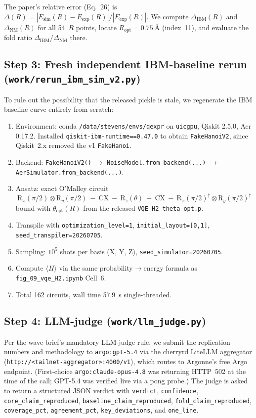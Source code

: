 \documentclass[11pt]{article}
\begin{document}
The paper's relative error (Eq.~26) is $\Delta(R) = |E_{\mathrm{sim}}(R) - E_{\mathrm{exp}}(R)| / |E_{\mathrm{exp}}(R)|$. We compute $\Delta_{\mathrm{IBM}}(R)$ and $\Delta_{\mathrm{NM}}(R)$ for all 54~$R$ points, locate $R_{\mathrm{opt}}=\SI{0.75}{\angstrom}$ (index~11), and evaluate the fold ratio $\Delta_{\mathrm{IBM}}/\Delta_{\mathrm{NM}}$ there.

\subsection{Step 3: Fresh independent IBM-baseline rerun (\texttt{work/rerun\_ibm\_sim\_v2.py})}
To rule out the possibility that the released pickle is stale, we regenerate the IBM baseline curve entirely from scratch:
\begin{enumerate}
  \item Environment: conda \texttt{/data/stevens/envs/qexpr} on \texttt{uicgpu}, Qiskit 2.5.0, Aer 0.17.2. Installed \texttt{qiskit-ibm-runtime==0.47.0} to obtain \texttt{FakeHanoiV2}, since Qiskit~2.x removed the v1 \texttt{FakeHanoi}.
  \item Backend: \texttt{FakeHanoiV2()} $\to$ \texttt{NoiseModel.from\_backend(...)} $\to$ \texttt{AerSimulator.from\_backend(...)}.
  \item Ansatz: exact O'Malley circuit
    \[\text{R}_x(\pi/2)\otimes\text{R}_y(\pi/2)\ -\ \text{CX}\ -\ \text{R}_z(\theta)\ -\ \text{CX}\ -\ \text{R}_x(\pi/2)^\dagger\otimes\text{R}_y(\pi/2)^\dagger\]
    bound with $\theta_{\mathrm{opt}}(R)$ from the released \texttt{VQE\_H2\_theta\_opt.p}.
  \item Transpile with \texttt{optimization\_level=1}, \texttt{initial\_layout=[0,1]}, \texttt{seed\_transpiler=20260705}.
  \item Sampling: $10^5$ shots per basis (X, Y, Z), \texttt{seed\_simulator=20260705}.
  \item Compute $\langle H\rangle$ via the same probability$\to$energy formula as \texttt{fig\_09\_vqe\_H2.ipynb} Cell~6.
  \item Total 162 circuits, wall time \SI{57.9}{\second} single-threaded.
\end{enumerate}

\subsection{Step 4: LLM-judge (\texttt{work/llm\_judge.py})}
Per the wave brief's mandatory LLM-judge rule, we submit the replication numbers and methodology to \texttt{argo:gpt-5.4} via the cherryrd LiteLLM aggregator (\texttt{http://<tailnet-aggregator>:4000/v1}), which routes to Argonne's free Argo endpoint. (First-choice \texttt{argo:claude-opus-4.8} was returning HTTP~502 at the time of the call; GPT-5.4 was verified live via a pong probe.) The judge is asked to return a structured JSON verdict with \texttt{verdict}, \texttt{confidence}, \texttt{core\_claim\_reproduced}, \texttt{baseline\_claim\_reproduced}, \texttt{fold\_claim\_reproduced}, \texttt{coverage\_pct}, \texttt{agreement\_pct}, \texttt{key\_deviations}, and \texttt{one\_line}.
\end{document}
